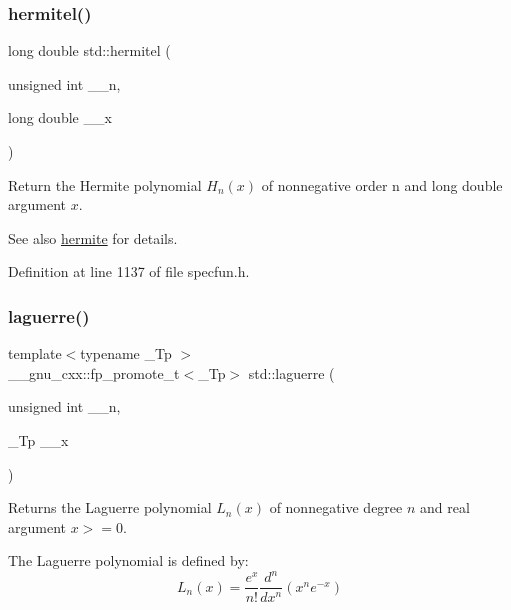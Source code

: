\subsubsection{\texorpdfstring{hermitel()}{hermitel()}}
{\footnotesize\ttfamily long double std\+::hermitel (\begin{DoxyParamCaption}\item[{unsigned int}]{\+\_\+\+\_\+n,  }\item[{long double}]{\+\_\+\+\_\+x }\end{DoxyParamCaption})\hspace{0.3cm}{\ttfamily [inline]}}

Return the Hermite polynomial $ H_n(x) $ of nonnegative order n and {\ttfamily long double} argument $ x $.

\begin{DoxySeeAlso}{See also}
\hyperlink{group__cxx17__math__spec__func_ga8bd1626f1e3f7256c4fd13579f881183}{hermite} for details. 
\end{DoxySeeAlso}


Definition at line 1137 of file specfun.\+h.

\mbox{\label{group__cxx17__math__spec__func_ga9d7b24a11dad27690387405548973ef9}} 
\subsubsection{\texorpdfstring{laguerre()}{laguerre()}}
{\footnotesize\ttfamily template$<$typename \+\_\+\+Tp $>$ \\
\+\_\+\+\_\+gnu\+\_\+cxx\+::fp\+\_\+promote\+\_\+t$<$\+\_\+\+Tp$>$ std\+::laguerre (\begin{DoxyParamCaption}\item[{unsigned int}]{\+\_\+\+\_\+n,  }\item[{\+\_\+\+Tp}]{\+\_\+\+\_\+x }\end{DoxyParamCaption})\hspace{0.3cm}{\ttfamily [inline]}}

Returns the Laguerre polynomial $ L_n(x) $ of nonnegative degree $ n $ and real argument $ x >= 0 $.

The Laguerre polynomial is defined by\+: \[ L_n(x) = \frac{e^x}{n!} \frac{d^n}{dx^n} (x^ne^{-x}) \]


